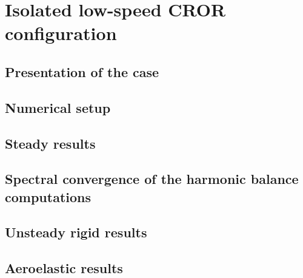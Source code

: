 \chapter{Isolated low-speed CROR configuration}
\label{cha:dream_ls_isolated}

\chabstract{}


\newpage

\section{Presentation of the case}
\label{sec:dream_presentation}


\section{Numerical setup}
\label{sec:dream_ls_numerical}


\section{Steady results}
\label{sec:dream_ls_steady_results}


\section{Spectral convergence of the harmonic balance computations}
\label{sec:dream_ls_spectral_convergence}


\section{Unsteady rigid results}
\label{sec:dream_ls_rigid_results}


\section{Aeroelastic results}
\label{sec:dream_ls_ael_results}

